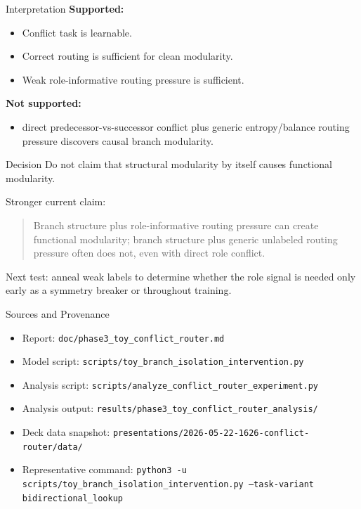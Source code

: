 \documentclass[aspectratio=169]{beamer}
\begin{document}
\begin{frame}{Interpretation}
  \textbf{Supported:}
  \begin{itemize}
    \item Conflict task is learnable.
    \item Correct routing is sufficient for clean modularity.
    \item Weak role-informative routing pressure is sufficient.
  \end{itemize}

  \vspace{0.6em}
  \textbf{Not supported:}
  \begin{itemize}
    \item direct predecessor-vs-successor conflict plus generic entropy/balance
      routing pressure discovers causal branch modularity.
  \end{itemize}
\end{frame}

\begin{frame}{Decision}
  Do not claim that structural modularity by itself causes functional modularity.

  \vspace{0.8em}
  Stronger current claim:
  \begin{quote}
    Branch structure plus role-informative routing pressure can create functional
    modularity; branch structure plus generic unlabeled routing pressure often
    does not, even with direct role conflict.
  \end{quote}

  \vspace{0.8em}
  Next test: anneal weak labels to determine whether the role signal is needed
  only early as a symmetry breaker or throughout training.
\end{frame}

\begin{frame}{Sources and Provenance}
  \scriptsize
  \begin{itemize}
    \item Report: \texttt{doc/phase3\_toy\_conflict\_router.md}
    \item Model script: \texttt{scripts/toy\_branch\_isolation\_intervention.py}
    \item Analysis script: \texttt{scripts/analyze\_conflict\_router\_experiment.py}
    \item Analysis output: \texttt{results/phase3\_toy\_conflict\_router\_analysis/}
    \item Deck data snapshot: \texttt{presentations/2026-05-22-1626-conflict-router/data/}
    \item Representative command: \texttt{python3 -u scripts/toy\_branch\_isolation\_intervention.py --task-variant bidirectional\_lookup}
  \end{itemize}
\end{frame}
\end{document}
